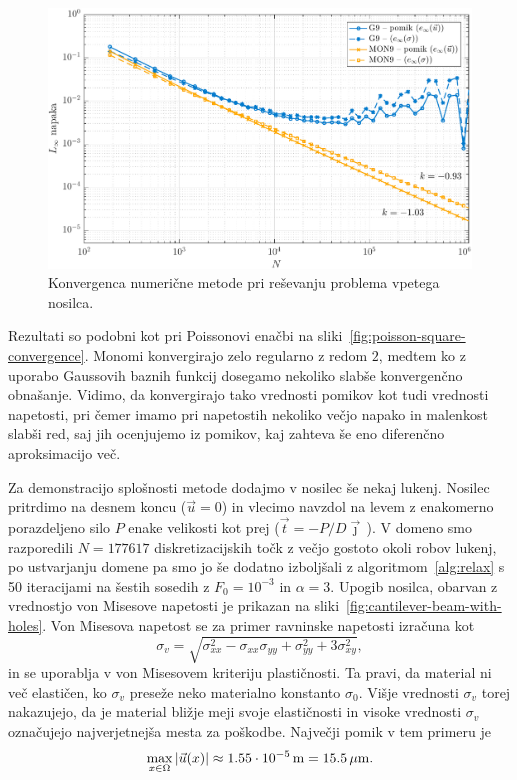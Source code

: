 \documentclass[12pt,a4paper,twoside]{article}
\theoremstyle{definition} %
\theoremstyle{plain} %
\numberwithin{equation}{section}
\newcommand{\vt}{\vec{t}}
\newcommand{\vu}{\vec{u}}
\newcommand{\vj}{\vec{\jmath}}
\newcommand{\ts}{\sigma}
\newlength{\iw}
\begin{document}
\begin{figure}[h]
  \centering
  \includegraphics[width=\iw]{images/cantilever_beam_convergence.pdf}
  \caption{Konvergenca numerične metode pri reševanju problema vpetega nosilca.}
  \label{fig:cantilever-beam-convergence}
\end{figure}
Rezultati so podobni kot pri Poissonovi enačbi na sliki~\ref{fig:poisson-square-convergence}.
Monomi konvergirajo zelo regularno z redom $2$, medtem ko z uporabo Gaussovih baznih funkcij
dosegamo nekoliko slabše konvergenčno obnašanje. Vidimo, da konvergirajo tako vrednosti pomikov kot
tudi vrednosti napetosti, pri čemer imamo pri napetostih nekoliko večjo napako in malenkost slabši red,
saj jih ocenjujemo iz pomikov, kaj zahteva še eno diferenčno aproksimacijo več.

Za demonstracijo splošnosti metode dodajmo v nosilec še nekaj lukenj. Nosilec pritrdimo na desnem
koncu ($\vu = 0$) in vlecimo navzdol na levem z enakomerno porazdeljeno silo $P$ enake velikosti kot
prej ($\vt = -P/D\vj$\,). V domeno smo razporedili $N = 177617$ diskretizacijskih točk z večjo
gostoto okoli robov lukenj, po ustvarjanju domene pa smo jo še dodatno izboljšali z
algoritmom~\ref{alg:relax} s 50 iteracijami na šestih sosedih z $F_0 = 10^{-3}$ in $\alpha = 3$.
Upogib nosilca, obarvan z vrednostjo von Misesove napetosti je prikazan na
sliki~\ref{fig:cantilever-beam-with-holes}. Von Misesova napetost se za primer ravninske napetosti
izračuna kot
\begin{equation}
  \sigma_v = \sqrt{\sigma_{xx}^2-\sigma_{xx}\sigma_{yy}+\sigma_{yy}^2+3\sigma_{xy}^2},
\end{equation}
in se uporablja v von Misesovem kriteriju plastičnosti. Ta pravi, da material ni več
elastičen, ko $\sigma_v$ preseže neko materialno konstanto $\sigma_0$. Višje vrednosti $\ts_v$
torej nakazujejo, da je material bližje meji svoje elastičnosti in visoke vrednosti $\ts_v$
označujejo najverjetnejša mesta za poškodbe. Največji pomik v tem primeru je
\begin{equation}
  \max_{x \in \Omega} |\vu(x)| \approx \unit[1.55 \cdot 10^{-5}]{m} = \unit[15.5]{\mu m}.
\end{equation}
\end{document}
